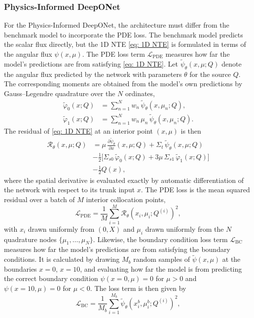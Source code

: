 \documentclass[%
 reprint,
 amsmath,amssymb,
 aps,
]{revtex4-1}
\begin{document}
\subsubsection{Physics-Informed DeepONet}

For the Physics-Informed DeepONet, the architecture must differ from the benchmark model to incorporate the PDE loss. The benchmark
model predicts the scalar flux directly, but the 1D NTE \eqref{eq: 1D NTE} is formulated in terms of the angular flux $\psi(x, \mu)$.
The PDE loss term $\mathcal{L}_{\mathrm{PDE}}$ measures how far the model's predictions are from satisfying \eqref{eq: 1D NTE}.
Let $\tilde{\psi}_\theta(x,\mu;Q)$ denote the angular flux predicted by the network with parameters $\theta$ for the source $Q$. The
corresponding moments are obtained from the model's own predictions by Gauss--Legendre quadrature over the $N$ ordinates,
\begin{align}
  \tilde{\varphi}_0(x;Q) &= \sum_{n=1}^{N} w_n\, \tilde{\psi}_\theta(x,\mu_n;Q), \\
  \tilde{\varphi}_1(x;Q) &= \sum_{n=1}^{N} w_n\, \mu_n\, \tilde{\psi}_\theta(x,\mu_n;Q).
\end{align}
The residual of \eqref{eq: 1D NTE} at an interior point $(x,\mu)$ is then
\begin{align}
  \mathcal{R}_\theta(x,\mu;Q) &= \mu\,\frac{\partial \tilde{\psi}_\theta}{\partial x}(x,\mu;Q) + \Sigma_t\, \tilde{\psi}_\theta(x,\mu;Q) \nonumber \\
    &- \frac{1}{2}\Big[ \Sigma_{s0}\, \tilde{\varphi}_0(x;Q) + 3\mu\, \Sigma_{s1}\, \tilde{\varphi}_1(x;Q) \Big] \nonumber \\
    &- \frac{1}{2} Q(x),
\end{align}
where the spatial derivative is evaluated exactly by automatic differentiation of the network with respect to its trunk input $x$. The PDE
loss is the mean squared residual over a batch of $M$ interior collocation points,
\begin{equation}
  \mathcal{L}_{\mathrm{PDE}}
    = \frac{1}{M} \sum_{i=1}^{M}
      \mathcal{R}_\theta\!\left(x_i, \mu_i; Q^{(i)}\right)^{2},
\end{equation}
with $x_i$ drawn uniformly from $(0,X)$ and $\mu_i$ drawn uniformly from the $N$ quadrature nodes $\{\mu_1,\dots,\mu_N\}$.
Likewise, the boundary condition loss term $\mathcal{L}_{\text{BC}}$ measures how far the model's predictions are from satisfying the boundary conditions.
It is calculated by drawing $M_b$ random samples of $\tilde{\psi}(x,\mu)$ at the boundaries $x = 0$, $x=10$, and evaluating how far the model is from predicting
the correct boundary condition $\psi(x=0, \mu) = 0$ for $\mu > 0$ and $\psi(x=10, \mu) = 0$ for $\mu < 0$. The loss term is then given by
\begin{equation}
  \mathcal{L}_{\mathrm{BC}}
    = \frac{1}{M_b} \sum_{i=1}^{M_b}
      \tilde{\psi}_\theta\!\left(x_i^{b}, \mu_i^{b}; Q^{(i)}\right)^{2},
\end{equation}
\end{document}
